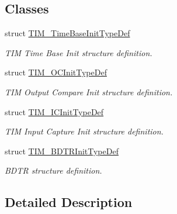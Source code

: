 \subsection*{Classes}
\begin{DoxyCompactItemize}
\item 
struct \hyperlink{struct_t_i_m___time_base_init_type_def}{T\+I\+M\+\_\+\+Time\+Base\+Init\+Type\+Def}
\begin{DoxyCompactList}\small\item\em T\+IM Time Base Init structure definition. \end{DoxyCompactList}\item 
struct \hyperlink{struct_t_i_m___o_c_init_type_def}{T\+I\+M\+\_\+\+O\+C\+Init\+Type\+Def}
\begin{DoxyCompactList}\small\item\em T\+IM Output Compare Init structure definition. \end{DoxyCompactList}\item 
struct \hyperlink{struct_t_i_m___i_c_init_type_def}{T\+I\+M\+\_\+\+I\+C\+Init\+Type\+Def}
\begin{DoxyCompactList}\small\item\em T\+IM Input Capture Init structure definition. \end{DoxyCompactList}\item 
struct \hyperlink{struct_t_i_m___b_d_t_r_init_type_def}{T\+I\+M\+\_\+\+B\+D\+T\+R\+Init\+Type\+Def}
\begin{DoxyCompactList}\small\item\em B\+D\+TR structure definition. \end{DoxyCompactList}\end{DoxyCompactItemize}


\subsection{Detailed Description}
